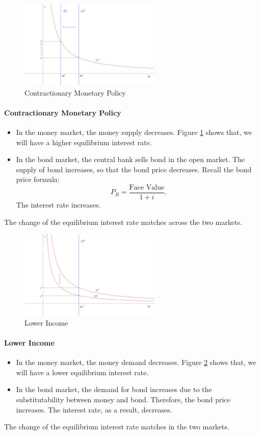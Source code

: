 \documentclass[12pt]{article}
\begin{document}
\begin{figure}[htp]
    \centering
    \includegraphics[width=0.6\textwidth]{money_eqm_02.png}
    \caption{Contractionary Monetary Policy}
    \label{fig:money_eqm_02}
\end{figure}

\paragraph{Contractionary Monetary Policy}
\begin{itemize}
	\item In the money market, the money supply decreases. Figure \ref{fig:money_eqm_02} shows that, we will have a higher equilibrium interest rate.
	\item In the bond market, the central bank sells bond in the open market. The supply of bond increases, so that the bond price decreases. Recall the bond price formula:
	\[P_B = \frac{\text{Face Value}}{1 + i}.\]
	The interest rate increases.
\end{itemize}
The change of the equilibrium interest rate matches across the two markets.\\


\begin{figure}[htp]
    \centering
    \includegraphics[width=0.6\textwidth]{money_eqm_03.png}
    \caption{Lower Income}
    \label{fig:money_eqm_03}
\end{figure}

\paragraph{Lower Income}
\begin{itemize}
	\item In the money market, the money demand decreases. Figure \ref{fig:money_eqm_03} shows that, we will have a lower equilibrium interest rate.
	\item In the bond market, the demand for bond increases due to the substitutability between money and bond. Therefore, the bond price increases. The interest rate, as a result, decreases. 
\end{itemize}
The change of the equilibrium interest rate matches in the two markets.
\end{document}
